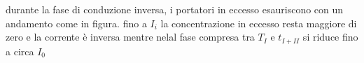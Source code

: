 durante la fase di conduzione inversa, i portatori in eccesso esauriscono con un andamento come in figura. fino a $I_i$ la concentrazione in eccesso resta maggiore di zero e la corrente è inversa mentre nelal fase compresa tra $T_I$ e $t_{I+II}$ si riduce fino a circa $I_0$
\begin{center}
\end{center}

